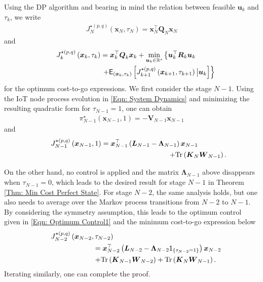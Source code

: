 \documentclass[10pt, journal, letterpaper]{IEEEtran}
\newcommand{\paren}[1]{\left(#1\right)}
\newcommand{\field}[1]{\ensuremath{\mathbb{#1}}}
\newcommand{\R}{\ensuremath{\field{R}}} %
\newcommand{\1}{\ensuremath{\mathbf{1}}} %
\newcommand{\I}[1]{\ensuremath{\mathsf{1}_{\left\{#1\right\}}}} %
\newcommand{\ESI}[2]{\ensuremath{\mathsf{E}_{#2}\left[#1 \right]}}
\newcommand{\mingocost}[3]{\ensuremath{J_{#3}^{\star \paren{#1, #2}}\paren{\vec{x}_{#3}, \tau_{#3}}}}
\newcommand{\mingocostON}[3]{\ensuremath{J_{#3}^{\star \paren{#1, #2}}\paren{\vec{x}_{#3}, 1}}}
\renewcommand{\vec}[1]{\ensuremath{\boldsymbol{#1}}} %
\newcommand{\tr}[1]{\ensuremath{{\rm Tr}\left(#1\right)}}
\begin{document}
\begin{IEEEproof}
Using the DP algorithm and bearing in mind the relation between feasible $\vec{u}_k$ and $\tau_k$, we write
\begin{eqnarray}
\mingocost{p}{q}{N} = \vec{x}_N^\top \vec{Q}_N \vec{x}_N \label{Eqn: Terminal Min Cost}
\end{eqnarray}
and
\begin{eqnarray}
\lefteqn{\mingocost{p}{q}{k} = \vec{x}_k^\top \vec{Q}_k \vec{x}_k + \min_{\vec{u}_{k} \in \R^s} \left\{ \vec{u}_{k}^\top \vec{R}_{k} \vec{u}_{k} \right.} \hspace{7.5cm} \nonumber \\
\lefteqn{\left. + \ESI{\mingocost{p}{q}{k+1} \big| \vec{u}_{k}}{\paren{\vec{x}_{k}, \tau_k}}\right\}} \hspace{5.2cm}
\end{eqnarray}
for the optimum cost-to-go expressions. We first consider the stage $N-1$. Using the IoT node process evolution in \eqref{Eqn: System Dynamics} and  minimizing the resulting quadratic form for $\tau_{N-1}=1$, one can obtain
\begin{eqnarray*}
\pi^\star_{N-1}\paren{\vec{x}_{N-1}, 1} = - \vec{V}_{N-1} \vec{x}_{N-1}
\end{eqnarray*}
and
\begin{eqnarray*}
\lefteqn{\mingocostON{p}{q}{N-1} = \vec{x}_{N-1}^\top \paren{\vec{L}_{N-1} - \vec{\Lambda}_{N-1}} \vec{x}_{N-1}} \hspace{8.0cm} \\
\lefteqn{+ \tr{\vec{K}_{N} \vec{W}_{N-1}}.} \hspace{2.1cm}
\end{eqnarray*}

On the other hand, no control is applied and the matrix $\vec{\Lambda}_{N-1}$ above disappears when $\tau_{N-1}=0$, which leads to the desired result for stage $N-1$ in Theorem \ref{Thm: Min Cost Perfect State}. For stage $N-2$, the same analysis holds, but one also needs to average over the Markov process transitions from $N-2$ to $N-1$. By considering the symmetry assumption, this leads to the optimum control given in \eqref{Eqn: Optimum Control1} and the minimum cost-to-go expression below
\begin{eqnarray*}
\lefteqn{\mingocost{p}{q}{N-2}} \hspace{8.0cm} \\
\lefteqn{= \vec{x}_{N-2}^\top \paren{\vec{L}_{N-2} - \vec{\Lambda}_{N-2} \I{\tau_{N-2} = 1}} \vec{x}_{N-2}} \hspace{5.8cm} \\
\lefteqn{+ \tr{\vec{K}_{N-1} \vec{W}_{N-2}} + \tr{\vec{K}_{N} \vec{W}_{N-1}}.} \hspace{5.8cm}
\end{eqnarray*}
Iterating similarly, one can complete the proof. \end{IEEEproof}
\end{document}

